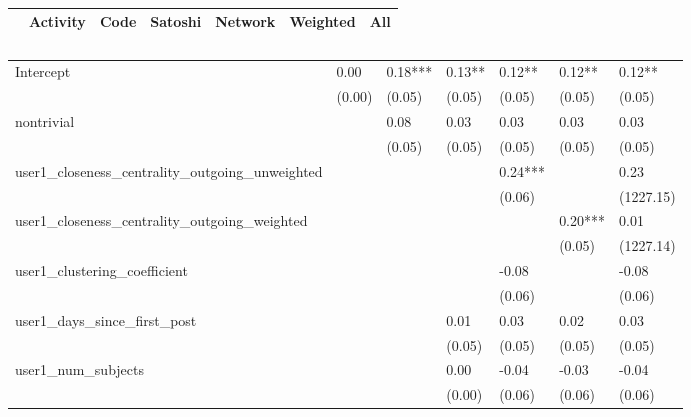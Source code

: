 \begin{table}
\caption{}
\begin{center}
\begin{tabular}{lcccccc}
\hline
                                               & Activity &   Code  & Satoshi & Network & Weighted &    All     \\
\hline
\hline
\end{tabular}
\begin{tabular}{lllllll}
Intercept                                      & 0.00     & 0.18*** & 0.13**  & 0.12**  & 0.12**   & 0.12**     \\
                                               & (0.00)   & (0.05)  & (0.05)  & (0.05)  & (0.05)   & (0.05)     \\
nontrivial                                     &          & 0.08    & 0.03    & 0.03    & 0.03     & 0.03       \\
                                               &          & (0.05)  & (0.05)  & (0.05)  & (0.05)   & (0.05)     \\
user1_closeness_centrality_outgoing_unweighted &          &         &         & 0.24*** &          & 0.23       \\
                                               &          &         &         & (0.06)  &          & (1227.15)  \\
user1_closeness_centrality_outgoing_weighted   &          &         &         &         & 0.20***  & 0.01       \\
                                               &          &         &         &         & (0.05)   & (1227.14)  \\
user1_clustering_coefficient                   &          &         &         & -0.08   &          & -0.08      \\
                                               &          &         &         & (0.06)  &          & (0.06)     \\
user1_days_since_first_post                    &          &         & 0.01    & 0.03    & 0.02     & 0.03       \\
                                               &          &         & (0.05)  & (0.05)  & (0.05)   & (0.05)     \\
user1_num_subjects                             &          &         & 0.00    & -0.04   & -0.03    & -0.04      \\
                                               &          &         & (0.00)  & (0.06)  & (0.06)   & (0.06)     \\

\end{tabular}
\end{center}
\end{table}
